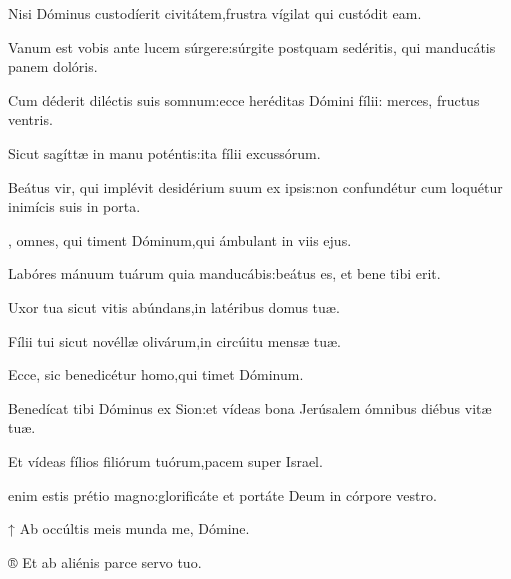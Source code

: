 \begin{multicols}{2}
Nisi Dóminus custodíerit civitátem,\GreStarNbsp frustra vígilat qui custódit eam.

Vanum est vobis ante lucem súrgere\thinspace:\GreStarNbsp súrgite postquam sedéritis, qui manducátis panem dolóris.

Cum déderit diléctis suis somnum\thinspace:\GreStarNbsp ecce heréditas Dómini fílii\thinspace: merces, fructus ventris.

Sicut sagíttæ in manu poténtis\thinspace:\GreStarNbsp ita fílii excussórum.

Beátus vir, qui implévit desidérium suum ex ipsis\thinspace:\GreStarNbsp non confundétur cum loquétur inimícis suis in porta.



\Normal

, omnes, qui timent Dóminum,\GreStarNbsp qui ámbulant in viis ejus.

Labóres mánuum tuárum quia manducábis\thinspace:\GreStarNbsp beátus es, et bene tibi erit.

Uxor tua sicut vitis abúndans,\GreStarNbsp in latéribus domus tuæ.

Fílii tui sicut novéllæ olivárum,\GreStarNbsp in circúitu mensæ tuæ.

Ecce, sic benedicétur homo,\GreStarNbsp qui timet Dóminum.

Benedícat tibi Dóminus ex Sion\thinspace:\GreStarNbsp et vídeas bona Jerúsalem ómnibus diébus vitæ tuæ.

Et vídeas fílios filiórum tuórum,\GreStarNbsp pacem super Israel.



 enim estis prétio magno\thinspace:\GreStarNbsp glo\-rificáte et portáte Deum in córpore vestro.

\vspace{0.3cm}

↑ Ab occúltis meis munda me, Dómine.

® Et ab aliénis parce servo tuo.

\end{multicols}

\vspace{0.3cm}

\Ligne

\Normal

\vspace{0.5cm}

